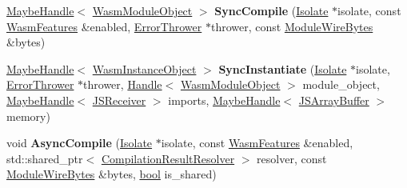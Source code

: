 \begin{DoxyCompactItemize}
\item 
\mbox{\label{classv8_1_1internal_1_1wasm_1_1WasmEngine_a6892238feb266e57371ed9aa88c38ee6}} 
\mbox{\hyperlink{classv8_1_1internal_1_1MaybeHandle}{Maybe\+Handle}}$<$ \mbox{\hyperlink{classv8_1_1internal_1_1WasmModuleObject}{Wasm\+Module\+Object}} $>$ {\bfseries Sync\+Compile} (\mbox{\hyperlink{classv8_1_1internal_1_1Isolate}{Isolate}} $\ast$isolate, const \mbox{\hyperlink{structv8_1_1internal_1_1wasm_1_1WasmFeatures}{Wasm\+Features}} \&enabled, \mbox{\hyperlink{classv8_1_1internal_1_1wasm_1_1ErrorThrower}{Error\+Thrower}} $\ast$thrower, const \mbox{\hyperlink{structv8_1_1internal_1_1wasm_1_1ModuleWireBytes}{Module\+Wire\+Bytes}} \&bytes)
\item 
\mbox{\label{classv8_1_1internal_1_1wasm_1_1WasmEngine_acaaae132f9415e5194a088e8f466328a}} 
\mbox{\hyperlink{classv8_1_1internal_1_1MaybeHandle}{Maybe\+Handle}}$<$ \mbox{\hyperlink{classv8_1_1internal_1_1WasmInstanceObject}{Wasm\+Instance\+Object}} $>$ {\bfseries Sync\+Instantiate} (\mbox{\hyperlink{classv8_1_1internal_1_1Isolate}{Isolate}} $\ast$isolate, \mbox{\hyperlink{classv8_1_1internal_1_1wasm_1_1ErrorThrower}{Error\+Thrower}} $\ast$thrower, \mbox{\hyperlink{classv8_1_1internal_1_1Handle}{Handle}}$<$ \mbox{\hyperlink{classv8_1_1internal_1_1WasmModuleObject}{Wasm\+Module\+Object}} $>$ module\+\_\+object, \mbox{\hyperlink{classv8_1_1internal_1_1MaybeHandle}{Maybe\+Handle}}$<$ \mbox{\hyperlink{classv8_1_1internal_1_1JSReceiver}{J\+S\+Receiver}} $>$ imports, \mbox{\hyperlink{classv8_1_1internal_1_1MaybeHandle}{Maybe\+Handle}}$<$ \mbox{\hyperlink{classv8_1_1internal_1_1JSArrayBuffer}{J\+S\+Array\+Buffer}} $>$ memory)
\item 
\mbox{\label{classv8_1_1internal_1_1wasm_1_1WasmEngine_aaacfae0e6099d8696eda0a2d8d7fecf4}} 
void {\bfseries Async\+Compile} (\mbox{\hyperlink{classv8_1_1internal_1_1Isolate}{Isolate}} $\ast$isolate, const \mbox{\hyperlink{structv8_1_1internal_1_1wasm_1_1WasmFeatures}{Wasm\+Features}} \&enabled, std\+::shared\+\_\+ptr$<$ \mbox{\hyperlink{classv8_1_1internal_1_1wasm_1_1CompilationResultResolver}{Compilation\+Result\+Resolver}} $>$ resolver, const \mbox{\hyperlink{structv8_1_1internal_1_1wasm_1_1ModuleWireBytes}{Module\+Wire\+Bytes}} \&bytes, \mbox{\hyperlink{classbool}{bool}} is\+\_\+shared)
\item 

\end{DoxyCompactItemize}
